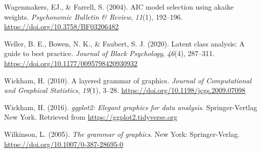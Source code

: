 \documentclass[
  ,man,floatsintext]{apa6}
\newlength{\cslhangindent}
\newlength{\cslentryspacingunit} %
\newenvironment{CSLReferences}[2] %
 {%
  \setlength{\parindent}{0pt}
  \ifodd #1
  \let\oldpar\par
  \def\par{\hangindent=\cslhangindent\oldpar}
  \fi
  \setlength{\parskip}{#2\cslentryspacingunit}
 }%
 {}
\begin{document}
\begin{CSLReferences}{1}{0}
\leavevmode{}%
Wagenmakers, EJ., \& Farrell, S. (2004). {AIC} model selection using akaike weights. \emph{Psychonomic Bulletin \& Review}, \emph{11}(1), 192--196. \url{https://doi.org/10.3758/BF03206482}

\leavevmode{}%
Weller, B. E., Bowen, N. K., \& Faubert, S. J. (2020). Latent class analysis: A guide to best practice. \emph{Journal of Black Psychology}, \emph{46}(4), 287--311. \url{https://doi.org/10.1177/0095798420930932}

\leavevmode{}%
Wickham, H. (2010). A layered grammar of graphics. \emph{Journal of Computational and Graphical Statistics}, \emph{19}(1), 3--28. \url{https://doi.org/10.1198/jcgs.2009.07098}

\leavevmode{}%
Wickham, H. (2016). \emph{ggplot2: Elegant graphics for data analysis}. Springer-Vertlag New York. Retrieved from \url{https://ggplot2.tidyverse.org}

\leavevmode{}%
Wilkinson, L. (2005). \emph{The grammar of graphics}. New York: Springer-Verlag. \url{https://doi.org/10.1007/0-387-28695-0}

\end{CSLReferences}
\end{document}
